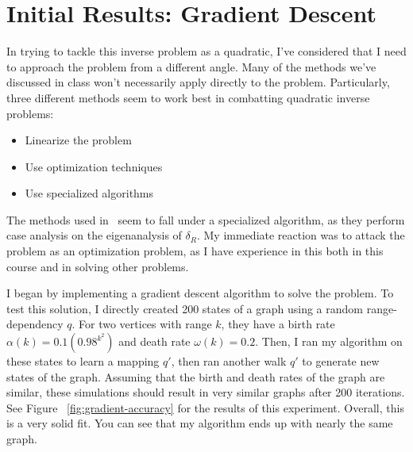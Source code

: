 \section{Initial Results: Gradient Descent}

In trying to tackle this inverse problem as a quadratic, I've considered that I need to approach the problem from a different angle.
Many of the methods we've discussed in class won't necessarily apply directly to the problem.
Particularly, three different methods seem to work best in combatting quadratic inverse problems:

\begin{itemize}
    \item Linearize the problem
    \item Use optimization techniques
    \item Use specialized algorithms
\end{itemize}

The methods used in~\cite{grindrod2009} seem to fall under a specialized algorithm, as they perform case analysis
on the eigenanalysis of $\delta_R$.
My immediate reaction was to attack the problem as an optimization problem, as I have experience in this
both in this course and in solving other problems.

I began by implementing a gradient descent algorithm to solve the problem.
To test this solution, I directly created 200 states of a graph using a random range-dependency $q$.
For two vertices with range $k$, they have a birth rate $\alpha (k) = 0.1(0.98^{k^2})$ and death rate $\omega (k) = 0.2$.
Then, I ran my algorithm on these states to learn a mapping $q'$, then ran another walk $q'$ to generate
new states of the graph.
Assuming that the birth and death rates of the graph are similar, these simulations should result in very similar graphs
after 200 iterations.
See Figure ~\ref{fig:gradient-accuracy} for the results of this experiment.
Overall, this is a very solid fit. You can see that my algorithm ends up with nearly the same graph.

